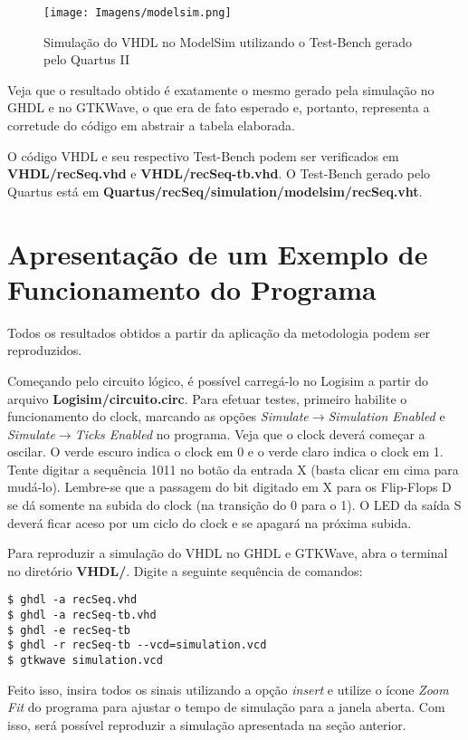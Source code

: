 \documentclass[12pt,a4paper]{article}
\begin{document}
\begin{figure}[h]
	\centering
	\texttt{[image: Imagens/modelsim.png]}
	\caption{Simulação do VHDL no ModelSim utilizando o Test-Bench gerado pelo Quartus II}
\end{figure}

Veja que o resultado obtido é exatamente o mesmo gerado pela simulação no GHDL e no GTKWave, o que era de fato esperado e, portanto, representa a corretude do código em abstrair a tabela elaborada.

O código VHDL e seu respectivo Test-Bench podem ser verificados em \textbf{VHDL/recSeq.vhd} e \textbf{VHDL/recSeq-tb.vhd}. O Test-Bench gerado pelo Quartus está em \textbf{Quartus/recSeq/simulation/modelsim/recSeq.vht}.

\section{Apresentação de um Exemplo de Funcionamento do Programa}

Todos os resultados obtidos a partir da aplicação da metodologia podem ser reproduzidos. 

Começando pelo circuito lógico, é possível carregá-lo no Logisim a partir do arquivo \textbf{Logisim/circuito.circ}. Para efetuar testes, primeiro habilite o funcionamento do clock, marcando as opções \textsl{Simulate$\rightarrow$Simulation Enabled} e \textsl{Simulate$\rightarrow$Ticks Enabled} no programa. Veja que o clock deverá começar a oscilar. O verde escuro indica o clock em 0 e o verde claro indica o clock em 1. Tente digitar a sequência 1011 no botão da entrada X (basta clicar em cima para mudá-lo). Lembre-se que a passagem do bit digitado em X para os Flip-Flops D se dá somente na subida do clock (na transição do 0 para o 1). O LED da saída S deverá ficar aceso por um ciclo do clock e se apagará na próxima subida.

Para reproduzir a simulação do VHDL no GHDL e GTKWave, abra o terminal no diretório \textbf{VHDL/}. Digite a seguinte sequência de comandos:

\begin{lstlisting}
$ ghdl -a recSeq.vhd
$ ghdl -a recSeq-tb.vhd
$ ghdl -e recSeq-tb
$ ghdl -r recSeq-tb --vcd=simulation.vcd
$ gtkwave simulation.vcd
\end{lstlisting}

Feito isso, insira todos os sinais utilizando a opção \textsl{insert} e utilize o ícone \textsl{Zoom Fit} do programa para ajustar o tempo de simulação para a janela aberta. Com isso, será possível reproduzir a simulação apresentada na seção anterior.
\end{document}
